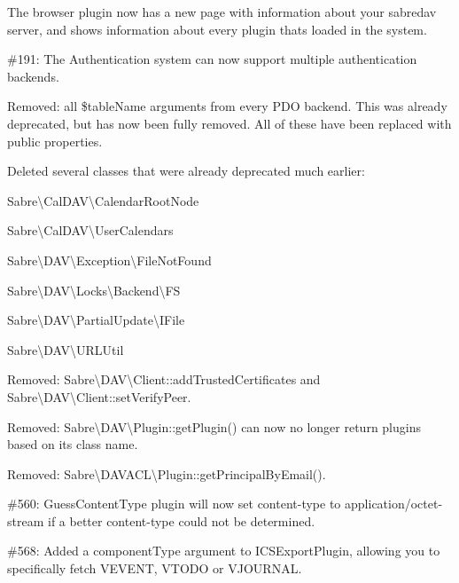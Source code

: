 \begin{DoxyItemize}
\item The browser plugin now has a new page with information about your sabredav server, and shows information about every plugin that\textquotesingle{}s loaded in the system.
\item \#191\+: The Authentication system can now support multiple authentication backends.
\item Removed\+: all {\ttfamily \$table\+Name} arguments from every P\+DO backend. This was already deprecated, but has now been fully removed. All of these have been replaced with public properties.
\item Deleted several classes that were already deprecated much earlier\+:
\begin{DoxyItemize}
\item {\ttfamily Sabre\textbackslash{}Cal\+D\+AV\textbackslash{}Calendar\+Root\+Node}
\item {\ttfamily Sabre\textbackslash{}Cal\+D\+AV\textbackslash{}User\+Calendars}
\item {\ttfamily Sabre\textbackslash{}D\+AV\textbackslash{}Exception\textbackslash{}File\+Not\+Found}
\item {\ttfamily Sabre\textbackslash{}D\+AV\textbackslash{}Locks\textbackslash{}Backend\textbackslash{}FS}
\item {\ttfamily Sabre\textbackslash{}D\+AV\textbackslash{}Partial\+Update\textbackslash{}I\+File}
\item {\ttfamily Sabre\textbackslash{}D\+AV\textbackslash{}U\+R\+L\+Util}
\end{DoxyItemize}
\item Removed\+: {\ttfamily Sabre\textbackslash{}D\+AV\textbackslash{}Client\+::add\+Trusted\+Certificates} and {\ttfamily Sabre\textbackslash{}D\+AV\textbackslash{}Client\+::set\+Verify\+Peer}.
\item Removed\+: {\ttfamily Sabre\textbackslash{}D\+AV\textbackslash{}Plugin\+::get\+Plugin()} can now no longer return plugins based on its class name.
\item Removed\+: {\ttfamily Sabre\textbackslash{}D\+A\+V\+A\+CL\textbackslash{}Plugin\+::get\+Principal\+By\+Email()}.
\item \#560\+: Guess\+Content\+Type plugin will now set content-\/type to {\ttfamily application/octet-\/stream} if a better content-\/type could not be determined.
\item \#568\+: Added a {\ttfamily component\+Type} argument to {\ttfamily I\+C\+S\+Export\+Plugin}, allowing you to specifically fetch {\ttfamily V\+E\+V\+E\+NT}, {\ttfamily V\+T\+O\+DO} or {\ttfamily V\+J\+O\+U\+R\+N\+AL}.

\end{DoxyItemize}
